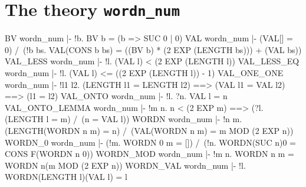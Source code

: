 \section{The theory {\tt wordn\_num}}
\THEOREM BV wordn\_num
|- !b. BV b = (b => SUC 0 | 0)
\ENDTHEOREM
\THEOREM VAL wordn\_num
|- (VAL[] = 0) /\
   (!b bs. VAL(CONS b bs) = ((BV b) * (2 EXP (LENGTH bs))) + (VAL bs))
\ENDTHEOREM
\THEOREM VAL\_LESS wordn\_num
|- !l. (VAL l) < (2 EXP (LENGTH l))
\ENDTHEOREM
\THEOREM VAL\_LESS\_EQ wordn\_num
|- !l. (VAL l) <= ((2 EXP (LENGTH l)) - 1)
\ENDTHEOREM
\THEOREM VAL\_ONE\_ONE wordn\_num
|- !l1 l2. (LENGTH l1 = LENGTH l2) ==> (VAL l1 = VAL l2) ==> (l1 = l2)
\ENDTHEOREM
\THEOREM VAL\_ONTO wordn\_num
|- !l. ?n. VAL l = n
\ENDTHEOREM
\THEOREM VAL\_ONTO\_LEMMA wordn\_num
|- !m n. n < (2 EXP m) ==> (?l. (LENGTH l = m) /\ (n = VAL l))
\ENDTHEOREM
\THEOREM WORDN wordn\_num
|- !n m. (LENGTH(WORDN n m) = n) /\ (VAL(WORDN n m) = m MOD (2 EXP n))
\ENDTHEOREM
\THEOREM WORDN\_0 wordn\_num
|- (!m. WORDN 0 m = []) /\ (!n. WORDN(SUC n)0 = CONS F(WORDN n 0))
\ENDTHEOREM
\THEOREM WORDN\_MOD wordn\_num
|- !m n. WORDN n m = WORDN n(m MOD (2 EXP n))
\ENDTHEOREM
\THEOREM WORDN\_VAL wordn\_num
|- !l. WORDN(LENGTH l)(VAL l) = l
\ENDTHEOREM

